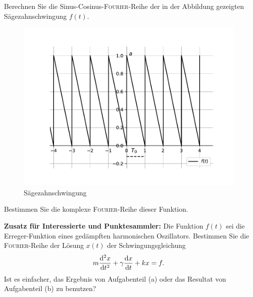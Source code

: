\documentclass{atistandalonetask}
\begin{document}
  \begin{atiTask}[
    title = Sägezahnschwingung
  ]


	\begin{atiSubtasks}
		\item Berechnen Sie die Sinus-Cosinus-\textsc{Fourier}-Reihe der in der Abbildung gezeigten Sägezahnschwingung $f(t)$.
		\begin{figure}[H]
			\centering
			\includegraphics[width=0.70\linewidth]{picture-fourier_v}
			\caption{Sägezahnschwingung}
			\end{figure}
		\item Bestimmen Sie die komplexe \textsc{Fourier}-Reihe dieser Funktion.
		\item \textbf{Zusatz für Interessierte und Punktesammler:} Die Funktion $f(t)$ sei die Erreger-Funktion eines gedämpften harmonischen Oszillators. Bestimmen Sie die \textsc{Fourier}-Reihe der Lösung $x(t)$ der Schwingungsgleichung
			\[
			m\leibnizDerivative[2]{x}{t}+\gamma \leibnizDerivative{x}{t}+kx=f.
			\]	
		Ist es einfacher, das Ergebnis von Aufgabenteil (a) oder das Resultat von Aufgabenteil (b) zu benutzen?	
	\end{atiSubtasks} 
  \end{atiTask}
  \begin{atiSolution}
      
  \end{atiSolution}
\end{document}
